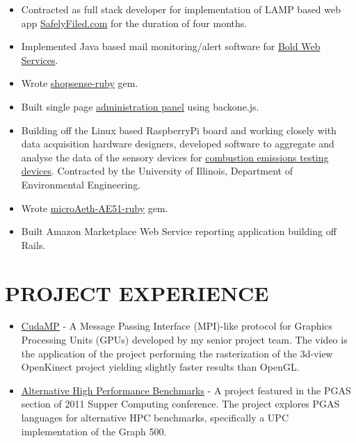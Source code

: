 \documentclass[margin]{res}
\begin{document}
\begin{resume}
\vspace{-5mm}
  \begin{itemize}
    \itemsep -2pt %
    \item Contracted as full stack developer for implementation of LAMP based web app \href{https://safelyfiled.com/home/}{SafelyFiled.com} for the duration of four months.
    \item Implemented Java based mail monitoring/alert software for \href{http://www.boldwebservices.com/}{Bold Web Services}.
    \item Wrote \href{http://rudycomputing.github.io/shopsense-ruby/}{shopsense-ruby} gem.
    \item Built single page \href{http://pure-refuge-1784.herokuapp.com/}{administration panel} using backone.js.
    \item Building off the Linux based RaspberryPi board and working closely with data acquisition hardware designers, developed software to aggregate and analyse the data of the sensory devices for \href{https://github.com/RudyComputing/CombustionEmissionsTesting}{combustion emissions testing devices}.  Contracted by the University of Illinois, Department of Environmental Engineering.
    \item Wrote \href{https://github.com/RudyComputing/microAeth-AE51-Ruby}{microAeth-AE51-ruby} gem.
    \item Built Amazon Marketplace Web Service reporting application building off Rails.
  \end{itemize}
\section{PROJECT EXPERIENCE}
\vspace{-1mm}
  \begin{itemize}
    \item \href{https://github.com/KurtRudolph/CudaMP/raw/master/Paper/CS493-RockwellCollins-FinalPaper.pdf}{CudaMP} - A Message Passing Interface (MPI)-like protocol for Graphics Processing Units (GPUs) developed by my senior project team. The video is the application of the project performing the rasterization of the 3d-view OpenKinect project yielding slightly faster results than OpenGL.
    \item \href{http://kurtrudolph.net/2012/10/11/alternative-high-performance-benchmarks/}{Alternative High Performance Benchmarks} - A project featured in the PGAS section of 2011 Supper Computing conference.  The project explores PGAS languages for alternative HPC benchmarks, specifically a UPC implementation of the Graph 500.
  \end{itemize}


\end{resume}
\end{document}
